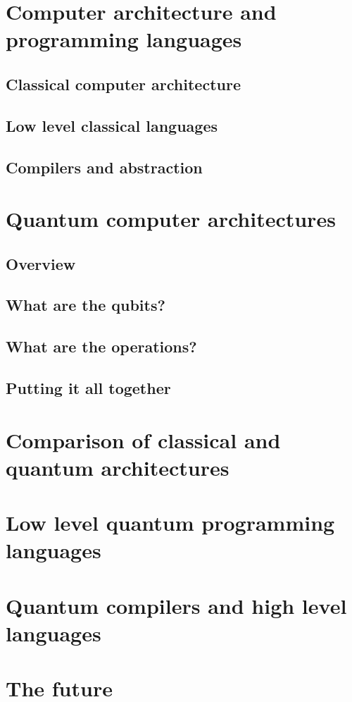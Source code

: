 \section{Computer architecture and programming languages}
\subsection{Classical computer architecture}
\subsection{Low level classical languages}
\subsection{Compilers and abstraction}
\section{Quantum computer architectures}
\subsection{Overview}
\subsection{What are the qubits?}
\subsection{What are the operations?}
\subsection{Putting it all together}
\section{Comparison of classical and quantum architectures}
\section{Low level quantum programming languages}
\section{Quantum compilers and high level languages}
\section{The future}
